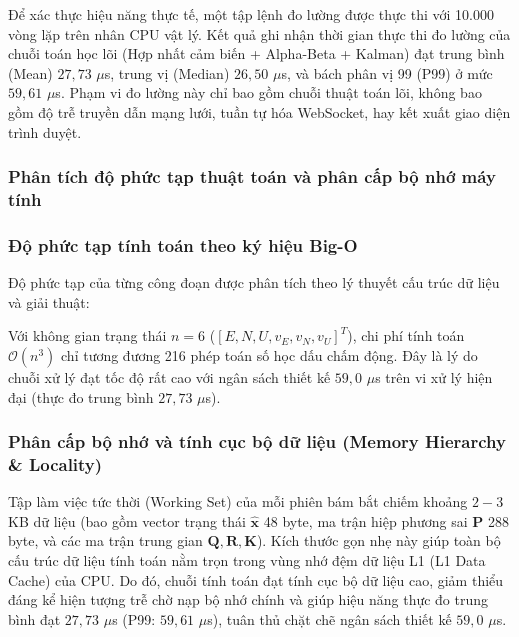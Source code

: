 Để xác thực hiệu năng thực tế, một tập lệnh đo lường được thực thi với 10.000 vòng lặp trên nhân CPU vật lý. Kết quả ghi nhận thời gian thực thi đo lường của chuỗi toán học lõi (Hợp nhất cảm biến + Alpha-Beta + Kalman) đạt trung bình (Mean) $27{,}73$ $\mu$s, trung vị (Median) $26{,}50$ $\mu$s, và bách phân vị 99 (P99) ở mức $59{,}61$ $\mu$s. Phạm vi đo lường này chỉ bao gồm chuỗi thuật toán lõi, không bao gồm độ trễ truyền dẫn mạng lưới, tuần tự hóa WebSocket, hay kết xuất giao diện trình duyệt.

\subsubsection{Phân tích độ phức tạp thuật toán và phân cấp bộ nhớ máy tính}


\subsubsection{Độ phức tạp tính toán theo ký hiệu Big-O}

\hspace{0.5cm} Độ phức tạp của từng công đoạn được phân tích theo lý thuyết cấu trúc dữ liệu và giải thuật:

Với không gian trạng thái $n=6$ ($[E, N, U, v_E, v_N, v_U]^T$), chi phí tính toán $\mathcal{O}(n^3)$ chỉ tương đương 216 phép toán số học dấu chấm động. Đây là lý do chuỗi xử lý đạt tốc độ rất cao với ngân sách thiết kế $59{,}0$ $\mu$s trên vi xử lý hiện đại (thực đo trung bình $27{,}73$ $\mu$s).

\subsubsection{Phân cấp bộ nhớ và tính cục bộ dữ liệu (Memory Hierarchy \texorpdfstring{\&}{và} Locality)}

\hspace{0.5cm} Tập làm việc tức thời (Working Set) của mỗi phiên bám bắt chiếm khoảng $2 - 3$ KB dữ liệu (bao gồm vector trạng thái $\hat{\mathbf{x}}$ 48 byte, ma trận hiệp phương sai $\mathbf{P}$ 288 byte, và các ma trận trung gian $\mathbf{Q}, \mathbf{R}, \mathbf{K}$). Kích thước gọn nhẹ này giúp toàn bộ cấu trúc dữ liệu tính toán nằm trọn trong vùng nhớ đệm dữ liệu L1 (L1 Data Cache) của CPU. Do đó, chuỗi tính toán đạt tính cục bộ dữ liệu cao, giảm thiểu đáng kể hiện tượng trễ chờ nạp bộ nhớ chính và giúp hiệu năng thực đo trung bình đạt $27{,}73$ $\mu$s (P99: $59{,}61$ $\mu$s), tuân thủ chặt chẽ ngân sách thiết kế $59{,}0$ $\mu$s.

